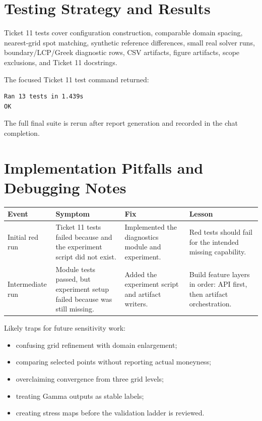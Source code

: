 \documentclass[11pt,a4paper]{article}
\begin{document}
\section{Testing Strategy and Results}

Ticket 11 tests cover configuration construction, comparable domain spacing, nearest-grid spot
matching, synthetic reference differences, small real solver runs, boundary/LCP/Greek diagnostic
rows, CSV artifacts, figure artifacts, scope exclusions, and Ticket 11 docstrings.

The focused Ticket 11 test command returned:
\begin{lstlisting}
Ran 13 tests in 1.439s
OK
\end{lstlisting}

The full final suite is rerun after report generation and recorded in the chat completion.

\section{Implementation Pitfalls and Debugging Notes}

\begin{longtable}{P{0.25\textwidth}L{0.24\textwidth}L{0.24\textwidth}L{0.16\textwidth}}
\toprule
Event & Symptom & Fix & Lesson \\
\midrule
\endhead
Initial red run & Ticket 11 tests failed because  and the experiment script did not exist. & Implemented the diagnostics module and experiment. & Red tests should fail for the intended missing capability. \\
Intermediate run & Module tests passed, but experiment setup failed because  was still missing. & Added the experiment script and artifact writers. & Build feature layers in order: API first, then artifact orchestration. \\
\bottomrule
\end{longtable}

Likely traps for future sensitivity work:
\begin{itemize}
  \item confusing grid refinement with domain enlargement;
  \item comparing selected points without reporting actual moneyness;
  \item overclaiming convergence from three grid levels;
  \item treating Gamma outputs as stable labels;
  \item creating stress maps before the validation ladder is reviewed.
\end{itemize}
\end{document}

